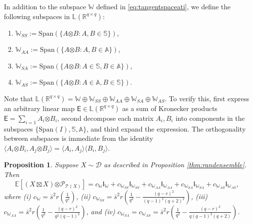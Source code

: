 \documentclass[11pt,letterpaper]{article}
\newtheorem{proposition}[theorem]{Proposition}
\newcommand{\R}{\mathbb{R}}
\newcommand{\botimes}{\boldsymbol \otimes}
\newcommand{\ct}{\mathcal{T}}
\newcommand{\cp}{\mathcal{P}}
\newcommand{\sfe}{\mathsf{E}}
\newcommand{\sfi}{\mathsf{I}}
\begin{document}
In addition to the subspace $\mathbb{W}$ defined in \eqref{eq:tangentspaceati}, we define the following subspaces in $\mathbb{L}(\R^{q\times q})$:
\begin{enumerate}
	\item $\mathbb{W}_{SS} := \mathrm{Span}(\{A \botimes B : A,B \in \mathbb{S} \})$,
	\item $\mathbb{W}_{AA} := \mathrm{Span}(\{A \botimes B : A,B \in \mathbb{A} \})$,
	\item $\mathbb{W}_{SA} := \mathrm{Span}(\{A \botimes B : A \in \mathbb{S}, B \in \mathbb{A} \})$,
	\item $\mathbb{W}_{AS} := \mathrm{Span}(\{A \botimes B : A \in \mathbb{A}, B \in \mathbb{S} \})$.
\end{enumerate}
Note that $\mathbb{L}(\R^{q\times q}) = \mathbb{W} \oplus \mathbb{W}_{SS} \oplus \mathbb{W}_{AA} \oplus \mathbb{W}_{SA} \oplus \mathbb{W}_{AS}$.  To verify this, first express an arbitrary linear map $\sfe \in \mathbb{L}(\R^{q\times q})$ as a sum of Kronecker products $\sfe = \sum_{i=1} A_i \botimes B_i$, second decompose each matrix $A_i,B_i$ into components in the subspaces $\{ \mathrm{Span}(I), \mathbb{S}, \mathbb{A} \}$, and third expand the expression.  The orthogonality between subspaces is immediate from the identity $\langle A_i \botimes B_i , A_j \botimes B_j \rangle  = \langle A_i , A_j \rangle \langle B_i, B_j \rangle$.


\begin{proposition}\label{thm:expectationofgiantoperator}
	Suppose $X\sim\mathcal{D}$ as described in Proposition \ref{thm:randensemble}.  Then
	\begin{equation*}
		\mathbb{E} [(X \boxtimes X) \botimes \cp_{\ct(X)}] = c_{\mathbb{W}} \sfi_{\mathbb{W}} + c_{\mathbb{W}_{SS}} \sfi_{\mathbb{W}_{SS}} + c_{\mathbb{W}_{AA}} \sfi_{\mathbb{W}_{AA}} + c_{\mathbb{W}_{SA}} \sfi_{\mathbb{W}_{SA}} + c_{\mathbb{W}_{AS}} \sfi_{\mathbb{W}_{AS}},
	\end{equation*} 
	where (i) $c_{\mathbb{W}} = \bar{s}^2 r(\frac{1}{q^2})$, (ii) $c_{\mathbb{W}_{SS}} = \bar{s}^2 r(\frac{1}{q^2} - \frac{(q-r)^2}{(q-1)^2(q+2)^2}) $, (iii) $c_{\mathbb{W}_{AA}} = \bar{s}^2 r(\frac{1}{q^2}- \frac{(q-r)^2}{q^2 (q-1)^2} )$,	and (iv) $c_{\mathbb{W}_{SA}} = c_{\mathbb{W}_{AS}} = \bar{s}^2 r(\frac{1}{q^2} - \frac{(q-r)^2}{q(q-1)^2(q+2)})$.
\end{proposition}
\end{document}
